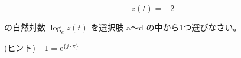 \[
z(t) = -2
\]

\bigskip
\noindent の自然対数 $\log_e z(t)$ を選択肢 a〜d の中から1つ選びなさい。 

\bigskip
\noindent (ヒント) $-1 = \textrm{e}^{\{j \cdot \pi\}}$
